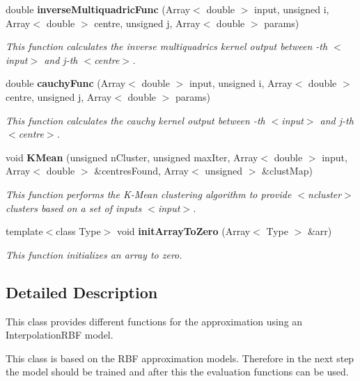 \begin{CompactItemize}
double {\bf inverse\-Multiquadric\-Func} (Array$<$ double $>$ input, unsigned i, Array$<$ double $>$ centre, unsigned j, Array$<$ double $>$ params)
\begin{CompactList}\small\item\em This function calculates the inverse multiquadrics kernel output between {\em -th $<$input$>$ and j-th $<$centre$>$. \/}\item\end{CompactList}\item 
double {\bf cauchy\-Func} (Array$<$ double $>$ input, unsigned i, Array$<$ double $>$ centre, unsigned j, Array$<$ double $>$ params)
\begin{CompactList}\small\item\em This function calculates the cauchy kernel output between {\em -th $<$input$>$ and j-th $<$centre$>$. \/}\item\end{CompactList}\item 
void {\bf KMean} (unsigned n\-Cluster, unsigned max\-Iter, Array$<$ double $>$ input, Array$<$ double $>$ \&centres\-Found, Array$<$ unsigned $>$ \&clust\-Map)
\begin{CompactList}\small\item\em This function performs the K-Mean clustering algorithm to provide $<$ncluster$>$ clusters based on a set of inputs $<$input$>$. \item\end{CompactList}\item 
template$<$class Type$>$ void {\bf init\-Array\-To\-Zero} (Array$<$ Type $>$ \&arr)
\begin{CompactList}\small\item\em This function initializes an array to zero. \item\end{CompactList}\end{CompactItemize}


\subsection{Detailed Description}
This class provides different functions for the approximation using an Interpolation\-RBF model. 

This class is based on the RBF approximation models. Therefore in the next step the model should be trained and after this the evaluation functions can be used. 



